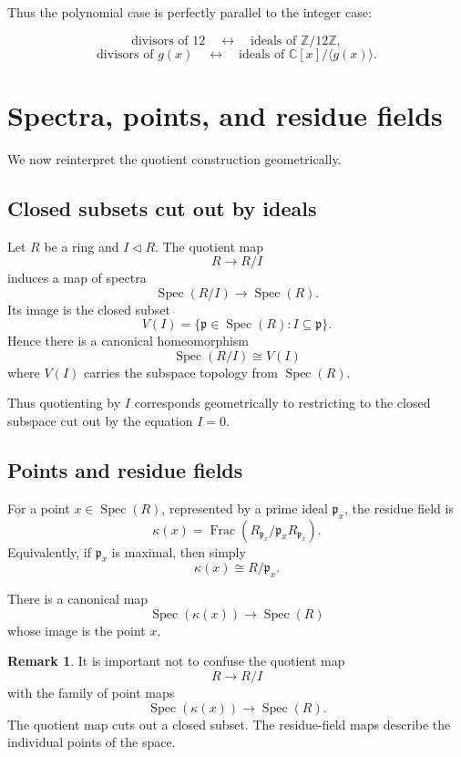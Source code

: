 \documentclass[11pt]{article}
\theoremstyle{definition}
\newtheorem{remark}[theorem]{Remark}
\newcommand{\Z}{\mathbb{Z}}
\newcommand{\C}{\mathbb{C}}
\newcommand{\Spec}{\operatorname{Spec}}
\newcommand{\ideal}[1]{\langle #1\rangle}
\newcommand{\kk}[1]{\kappa\!\left(#1\right)}
\begin{document}
	Thus the polynomial case is perfectly parallel to the integer case:
	
	\[
	\text{divisors of }12
	\quad\longleftrightarrow\quad
	\text{ideals of }\Z/12\Z,
	\]
	\[
	\text{divisors of }g(x)
	\quad\longleftrightarrow\quad
	\text{ideals of }\C[x]/\ideal{g(x)}.
	\]
	
	\section{Spectra, points, and residue fields}
	
	We now reinterpret the quotient construction geometrically.
	
	\subsection{Closed subsets cut out by ideals}
	
	Let $R$ be a ring and $I\triangleleft R$. The quotient map
	\[
	R\longrightarrow R/I
	\]
	induces a map of spectra
	\[
	\Spec(R/I)\longrightarrow \Spec(R).
	\]
	Its image is the closed subset
	\[
	V(I)=\{\mathfrak p\in \Spec(R): I\subseteq \mathfrak p\}.
	\]
	Hence there is a canonical homeomorphism
	\[
	\Spec(R/I)\cong V(I)
	\]
	where $V(I)$ carries the subspace topology from $\Spec(R)$.
	
	Thus quotienting by $I$ corresponds geometrically to restricting to the closed subspace cut out by the equation $I=0$.
	
	\subsection{Points and residue fields}
	
	For a point $x\in \Spec(R)$, represented by a prime ideal $\mathfrak p_x$, the residue field is
	\[
	\kk{x}=\operatorname{Frac}(R_{\mathfrak p_x}/\mathfrak p_xR_{\mathfrak p_x}).
	\]
	Equivalently, if $\mathfrak p_x$ is maximal, then simply
	\[
	\kk{x}\cong R/\mathfrak p_x.
	\]
	
	There is a canonical map
	\[
	\Spec(\kk{x})\longrightarrow \Spec(R)
	\]
	whose image is the point $x$.
	
	\begin{remark}
		It is important not to confuse the quotient map
		\[
		R\to R/I
		\]
		with the family of point maps
		\[
		\Spec(\kk{x})\to \Spec(R).
		\]
		The quotient map cuts out a closed subset. The residue-field maps describe the individual points of the space.
	\end{remark}
	
\end{document}
